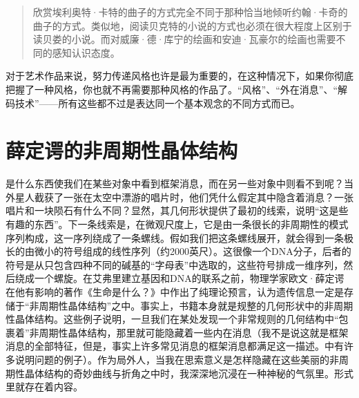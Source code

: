 \begin{quote}欣赏埃利奥特·卡特的曲子的方式完全不同于那种恰当地倾听约翰·卡奇的曲子的方式。类似地，阅读贝克特的小说的方式也必须在很大程度上区别于读贝娄的小说。而对威廉·德·库宁的绘画和安迪·瓦豪尔的绘画也需要不同的感知认识态度。
\end{quote}

对于艺术作品来说，努力传递风格也许是最为重要的，在这种情况下，如果你彻底把握了一种风格，你也就不再需要那种风格的作品了。“风格”、“外在消息”、“解码技术”——所有这些都不过是表达同一个基本观念的不同方式而已。

\section{薛定谔的非周期性晶体结构}

是什么东西使我们在某些对象中看到框架消息，而在另一些对象中则看不到呢？当外星人截获了一张在太空中漂游的唱片时，他们凭什么假定其中隐含着消息？一张唱片和一块陨石有什么不同？显然，其几何形状提供了最初的线索，说明“这是些有趣的东西”。下一条线索是，在微观尺度上，它是由一条很长的非周期性的模式序列构成，这一序列绕成了一条螺线。假如我们把这条螺线展开，就会得到一条极长的由微小的符号组成的线性序列（约2000英尺）。这很像一个DNA分子，后者的符号是从只包含四种不同的碱基的“字母表”中选取的，这些符号排成一维序列，然后绕成一个螺旋。在艾弗里建立基因和DNA的联系之前，物理学家欧文·薛定谔在他有影响的著作《生命是什么？》中作出了纯理论预言，认为遗传信息一定是存储于“非周期性晶体结构”之中。事实上，书籍本身就是规整的几何形状中的非周期性晶体结构。这些例子说明，一旦我们在某处发现一个非常规则的几何结构中“包裹着”非周期性晶体结构，那里就可能隐藏着一些内在消息（我不是说这就是框架消息的全部特征，但是，事实上许多常见消息的框架消息都满足这一描述。中有许多说明问题的例子）。作为局外人，当我在思索意义是怎样隐藏在这些美丽的非周期性晶体结构的奇妙曲线与折角之中时，我深深地沉浸在一种神秘的气氛里。形式里就存在着内容。

